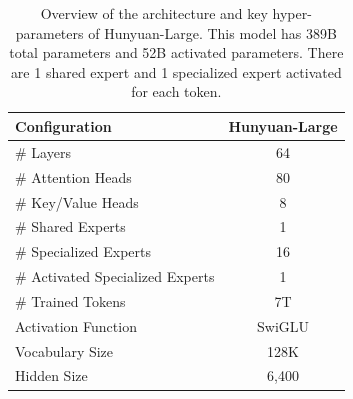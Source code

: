 \documentclass{article}
\begin{document}
\begin{table}[!hbtp]
    \centering
    \caption{Overview of the architecture and key hyper-parameters of Hunyuan-Large. This model has 389B total parameters and 52B activated parameters. There are 1 shared expert and 1 specialized expert activated for each token.}
        \begin{tabular}{l|c}
            \toprule
            \textbf{Configuration} & \textbf{Hunyuan-Large} \\
            \midrule
            \# Layers & 64\\
            \# Attention Heads & 80\\
            \# Key/Value Heads & 8\\
            \# Shared Experts & 1\\
            \# Specialized Experts & 16\\
            \# Activated Specialized Experts & 1\\
            \# Trained Tokens & 7T\\
            Activation Function & SwiGLU\\
            Vocabulary Size & 128K\\
            Hidden Size & 6,400\\
            \bottomrule
        \end{tabular}

    \label{tab:overall_para}
\end{table}
\end{document}
